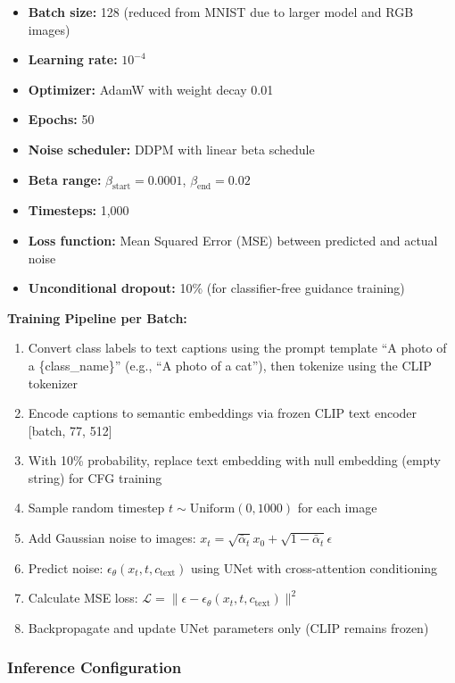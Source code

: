 \begin{itemize}
    \item \textbf{Batch size:} 128 (reduced from MNIST due to larger model and RGB images)
    \item \textbf{Learning rate:} $10^{-4}$
    \item \textbf{Optimizer:} AdamW with weight decay 0.01
    \item \textbf{Epochs:} 50
    \item \textbf{Noise scheduler:} DDPM with linear beta schedule
    \item \textbf{Beta range:} $\beta_{\text{start}} = 0.0001$, $\beta_{\text{end}} = 0.02$
    \item \textbf{Timesteps:} 1,000
    \item \textbf{Loss function:} Mean Squared Error (MSE) between predicted and actual noise
    \item \textbf{Unconditional dropout:} 10\% (for classifier-free guidance training)
\end{itemize}

\textbf{Training Pipeline per Batch:}
\begin{enumerate}
    \item Convert class labels to text captions using the prompt template ``A photo of a \{class\_name\}'' (e.g., ``A photo of a cat''), then tokenize using the CLIP tokenizer
    \item Encode captions to semantic embeddings via frozen CLIP text encoder [batch, 77, 512]
    \item With 10\% probability, replace text embedding with null embedding (empty string) for CFG training
    \item Sample random timestep $t \sim \text{Uniform}(0, 1000)$ for each image
    \item Add Gaussian noise to images: $x_t = \sqrt{\bar{\alpha}_t} x_0 + \sqrt{1-\bar{\alpha}_t} \epsilon$
    \item Predict noise: $\epsilon_\theta(x_t, t, c_{\text{text}})$ using UNet with cross-attention conditioning
    \item Calculate MSE loss: $\mathcal{L} = \|\epsilon - \epsilon_\theta(x_t, t, c_{\text{text}})\|^2$
    \item Backpropagate and update UNet parameters only (CLIP remains frozen)
\end{enumerate}

\subsubsection{Inference Configuration}

